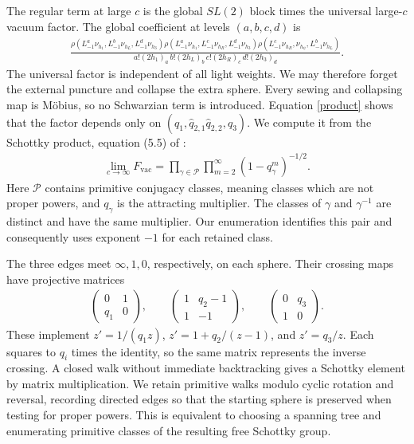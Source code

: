 \documentclass[12pt]{article}
\newcommand{\ie}{\begin{equation}\begin{aligned}}
\newcommand{\fe}{\end{aligned}\end{equation}}
\numberwithin{equation}{section}
\begin{document}
The regular term at large $c$ is the global $SL(2)$ block times the
universal large-$c$ vacuum factor.  The global coefficient at levels
$(a,b,c,d)$ is
\ie
 \frac{\rho(L_{-1}^a\nu_{h_1},L_{-1}^b\nu_{h_L},L_{-1}^d\nu_{h_3})
       \rho(L_{-1}^a\nu_{h_1},L_{-1}^c\nu_{h_R},L_{-1}^d\nu_{h_3})
       \rho(L_{-1}^c\nu_{h_R},\nu_{h_\psi},L_{-1}^b\nu_{h_L})}
 {a!(2h_1)_a\,b!(2h_L)_b\,c!(2h_R)_c\,d!(2h_3)_d}.
\fe
The universal factor is independent of all light weights.  We may
therefore forget the external puncture and collapse the extra sphere.
Every sewing and collapsing map is M\"obius, so no Schwarzian term is
introduced.  Equation \eqref{product} shows that the factor depends
only on $(q_1,\hat q_{2,1}\hat q_{2,2},q_3)$.
We compute it from the Schottky product, equation (5.5) of
\cite{CCY}:
\ie
 \lim_{c\to\infty}F_{\mathrm{vac}}
 =\prod_{\gamma\in\mathcal P}\prod_{m=2}^{\infty}
 (1-q_\gamma^m)^{-1/2}.
\fe
Here $\mathcal P$ contains primitive conjugacy classes, meaning classes
which are not proper powers, and $q_\gamma$ is the attracting multiplier.
The classes of $\gamma$ and $\gamma^{-1}$ are distinct and have the same
multiplier.  Our enumeration identifies this pair and consequently uses
exponent $-1$ for each retained class.

The three edges meet $\infty,1,0$, respectively, on each sphere.
Their crossing maps have projective matrices
\ie
 \begin{pmatrix}0&1\\q_1&0\end{pmatrix},\qquad
 \begin{pmatrix}1&q_2-1\\1&-1\end{pmatrix},\qquad
 \begin{pmatrix}0&q_3\\1&0\end{pmatrix}.
\fe
These implement $z'=1/(q_1z)$, $z'=1+q_2/(z-1)$, and $z'=q_3/z$.
Each squares to $q_i$ times the identity, so the same matrix represents
the inverse crossing.  A closed walk without immediate backtracking
gives a Schottky element by matrix multiplication.  We retain primitive
walks modulo cyclic rotation and reversal, recording directed edges so
that the starting sphere is preserved when testing for proper powers.
This is equivalent to choosing a spanning tree and enumerating primitive
classes of the resulting free Schottky group.
\end{document}
